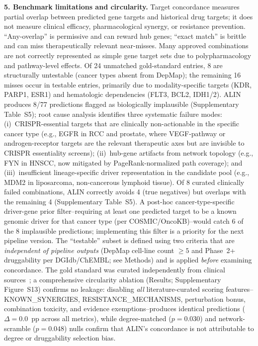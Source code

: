 \documentclass[11pt]{article}
\begin{document}
\textbf{5. Benchmark limitations and circularity.} Target concordance measures partial overlap between predicted gene targets and historical drug targets; it does not measure clinical efficacy, pharmacological synergy, or resistance prevention. ``Any-overlap'' is permissive and can reward hub genes; ``exact match'' is brittle and can miss therapeutically relevant near-misses. Many approved combinations are not correctly represented as simple gene target sets due to polypharmacology and pathway-level effects. Of 24 unmatched gold-standard entries, 8 are structurally untestable (cancer types absent from DepMap); the remaining 16 misses occur in testable entries, primarily due to modality-specific targets (KDR, PARP1, ESR1) and hematologic dependencies (FLT3, BCL2, IDH1/2). ALIN produces 8/77 predictions flagged as biologically implausible (Supplementary Table~S5); root cause analysis identifies three systematic failure modes: (i)~CRISPR-essential targets that are clinically non-actionable in the specific cancer type (e.g., EGFR in RCC and prostate, where VEGF-pathway or androgen-receptor targets are the relevant therapeutic axes but are invisible to CRISPR essentiality screens); (ii)~hub-gene artifacts from network topology (e.g., FYN in HNSCC, now mitigated by PageRank-normalized path coverage); and (iii)~insufficient lineage-specific driver representation in the candidate pool (e.g., MDM2 in liposarcoma, non-cancerous lymphoid tissue). Of 8 curated clinically failed combinations, ALIN correctly avoids 4 (true negatives) but overlaps with the remaining 4 (Supplementary Table~S5). A post-hoc cancer-type-specific driver-gene prior filter--requiring at least one predicted target to be a known genomic driver for that cancer type (per COSMIC/OncoKB)--would catch 6 of the 8 implausible predictions; implementing this filter is a priority for the next pipeline version. The ``testable'' subset is defined using two criteria that are \emph{independent of pipeline outputs} (DepMap cell-line count $\geq 5$ and Phase~2+ druggability per DGIdb/ChEMBL; see Methods) and is applied \emph{before} examining concordance. The gold standard was curated independently from clinical sources~\cite{Long2014,Kopetz2019,Turner2015,Daver2022}; a comprehensive circularity ablation (Results; Supplementary Figure~S13) confirms no leakage: disabling \emph{all} literature-curated scoring features--KNOWN\_SYNERGIES, RESISTANCE\_MECHANISMS, perturbation bonus, combination toxicity, and evidence exemptions--produces identical predictions ($\Delta = 0.0$~pp across all metrics), while degree-matched ($p = 0.030$) and network-scramble ($p = 0.048$) nulls confirm that ALIN's concordance is not attributable to degree or druggability selection bias.
\end{document}
